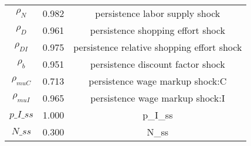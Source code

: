 \begin{center}
\begin{longtable}{ccc}
${\rho_N}$ 	 & 	 0.982 	 & 	 persistence labor supply shock\\
${\rho_D}$ 	 & 	 0.961 	 & 	 persistence shopping effort shock\\
${\rho_{DI}}$ 	 & 	 0.975 	 & 	 persistence relative shopping effort shock\\
${\rho_b}$ 	 & 	 0.951 	 & 	 persistence discount factor shock\\
${\rho_{muC}}$ 	 & 	 0.713 	 & 	 persistence wage markup shock:C\\
${\rho_{muI}}$ 	 & 	 0.965 	 & 	 persistence wage markup shock:I\\
$p\_I\_ss$ 	 & 	 1.000 	 & 	 p\_I\_ss\\
$N\_ss$ 	 & 	 0.300 	 & 	 N\_ss\\
\bottomrule%
\end{longtable}
\end{center}
